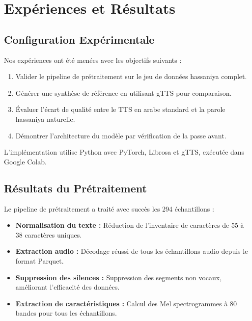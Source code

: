 \documentclass[12pt,a4paper]{article}
\begin{document}
\section{Expériences et Résultats}
\label{sec:experiments}

\subsection{Configuration Expérimentale}

Nos expériences ont été menées avec les objectifs suivants :

\begin{enumerate}
    \item Valider le pipeline de prétraitement sur le jeu de données hassaniya complet.
    \item Générer une synthèse de référence en utilisant gTTS pour comparaison.
    \item Évaluer l'écart de qualité entre le TTS en arabe standard et la parole hassaniya naturelle.
    \item Démontrer l'architecture du modèle par vérification de la passe avant.
\end{enumerate}

L'implémentation utilise Python avec PyTorch, Librosa et gTTS, exécutée dans Google Colab.

\subsection{Résultats du Prétraitement}

Le pipeline de prétraitement a traité avec succès les 294 échantillons :

\begin{itemize}
    \item \textbf{Normalisation du texte :} Réduction de l'inventaire de caractères de 55 à 38 caractères uniques.
    \item \textbf{Extraction audio :} Décodage réussi de tous les échantillons audio depuis le format Parquet.
    \item \textbf{Suppression des silences :} Suppression des segments non vocaux, améliorant l'efficacité des données.
    \item \textbf{Extraction de caractéristiques :} Calcul des Mel spectrogrammes à 80 bandes pour tous les échantillons.
\end{itemize}
\end{document}

